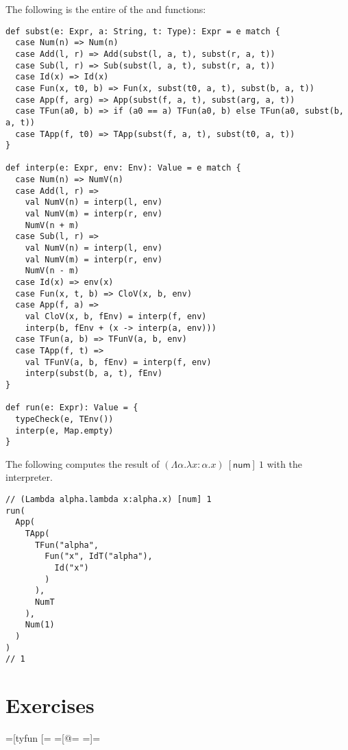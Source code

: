 The following is the entire of the  and  functions:

\begin{verbatim}
def subst(e: Expr, a: String, t: Type): Expr = e match {
  case Num(n) => Num(n)
  case Add(l, r) => Add(subst(l, a, t), subst(r, a, t))
  case Sub(l, r) => Sub(subst(l, a, t), subst(r, a, t))
  case Id(x) => Id(x)
  case Fun(x, t0, b) => Fun(x, subst(t0, a, t), subst(b, a, t))
  case App(f, arg) => App(subst(f, a, t), subst(arg, a, t))
  case TFun(a0, b) => if (a0 == a) TFun(a0, b) else TFun(a0, subst(b, a, t))
  case TApp(f, t0) => TApp(subst(f, a, t), subst(t0, a, t))
}

def interp(e: Expr, env: Env): Value = e match {
  case Num(n) => NumV(n)
  case Add(l, r) =>
    val NumV(n) = interp(l, env)
    val NumV(m) = interp(r, env)
    NumV(n + m)
  case Sub(l, r) =>
    val NumV(n) = interp(l, env)
    val NumV(m) = interp(r, env)
    NumV(n - m)
  case Id(x) => env(x)
  case Fun(x, t, b) => CloV(x, b, env)
  case App(f, a) =>
    val CloV(x, b, fEnv) = interp(f, env)
    interp(b, fEnv + (x -> interp(a, env)))
  case TFun(a, b) => TFunV(a, b, env)
  case TApp(f, t) =>
    val TFunV(a, b, fEnv) = interp(f, env)
    interp(subst(b, a, t), fEnv)
}

def run(e: Expr): Value = {
  typeCheck(e, TEnv())
  interp(e, Map.empty)
}
\end{verbatim}

The following computes the result of \((\Lambda\alpha.\lambda x:\alpha.x)\
[\textsf{num}]\ 1\) with the interpreter.

\begin{verbatim}
// (Lambda alpha.lambda x:alpha.x) [num] 1
run(
  App(
    TApp(
      TFun("alpha",
        Fun("x", IdT("alpha"),
          Id("x")
        )
      ),
      NumT
    ),
    Num(1)
  )
)
// 1
\end{verbatim}

\section{Exercises}

=[tyfun [=
=[@=
=]=

